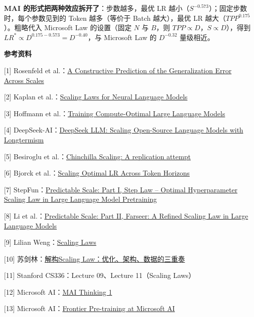 \documentclass[
  11pt,
  a4paper,
  fontset=none]{ctexart}
\begin{document}
\textbf{MAI 的形式把两种效应拆开了}：步数越多，最优 LR
越小（\(S^{-0.573}\)）；固定步数时，每个参数见到的 Token 越多（等价于
Batch 越大），最优 LR 越大（\(TPP^{0.175}\)）。粗略代入 Microsoft Law
的设置（固定 \(N\) 与 \(B\)，则 \(TPP\propto D\)，\(S\propto D\)），得到
\(LR^*\propto D^{0.175-0.573}=D^{-0.40}\)，与 Microsoft Law 的
\(D^{-0.32}\) 量级相近。

\textbf{参考资料}

{[}1{]} Rosenfeld et al.：\href{https://arxiv.org/abs/1909.12673}{A
Constructive Prediction of the Generalization Error Across Scales}

{[}2{]} Kaplan et al.：\href{https://arxiv.org/abs/2001.08361}{Scaling
Laws for Neural Language Models}

{[}3{]} Hoffmann et
al.：\href{https://arxiv.org/abs/2203.15556}{Training Compute-Optimal
Large Language Models}

{[}4{]} DeepSeek-AI：\href{https://arxiv.org/abs/2401.02954}{DeepSeek
LLM: Scaling Open-Source Language Models with Longtermism}

{[}5{]} Besiroglu et
al.：\href{https://arxiv.org/abs/2404.10102}{Chinchilla Scaling: A
replication attempt}

{[}6{]} Bjorck et al.：\href{https://arxiv.org/abs/2409.19913}{Scaling
Optimal LR Across Token Horizons}

{[}7{]} StepFun：\href{https://arxiv.org/abs/2503.04715}{Predictable
Scale: Part I, Step Law -- Optimal Hyperparameter Scaling Law in Large
Language Model Pretraining}

{[}8{]} Li et al.：\href{https://arxiv.org/abs/2506.10972}{Predictable
Scale: Part II, Farseer: A Refined Scaling Law in Large Language Models}

{[}9{]} Lilian
Weng：\href{https://lilianweng.github.io/posts/2026-06-24-scaling-laws/}{Scaling
Laws}

{[}10{]} 苏剑林：\href{https://kexue.fm/archives/11833}{解构Scaling
Law：优化、架构、数据的三重奏}

{[}11{]} Stanford CS336：Lecture 09、Lecture 11（Scaling Laws）

{[}12{]} Microsoft
AI：\href{https://microsoft.ai/pdf/mai-thinking-1.pdf}{MAI Thinking 1}

{[}13{]} Microsoft
AI：\href{https://microsoft.ai/news/frontier-pre-training-at-microsoft-ai/}{Frontier
Pre-training at Microsoft AI}
\end{document}
